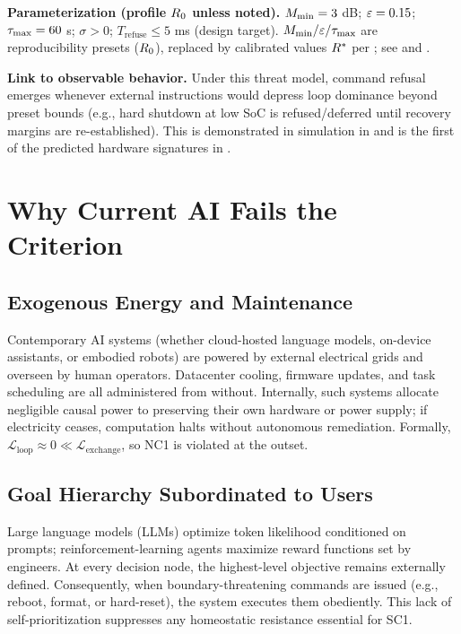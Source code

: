\documentclass[11pt]{article}
\begin{document}
\textbf{Parameterization (profile $R_0$ unless noted).} $M_{\min} = 3$ dB; $\varepsilon = 0.15$; $\tau_{\max} = 60$ s; $\sigma > 0$; $T_{\text{refuse}} \leq 5$ ms (design target). $M_{\min}/\varepsilon/\tau_{\max}$ are reproducibility presets ($R_0$), replaced by calibrated values $R^*$ per ; see  and .

\textbf{Link to observable behavior.} Under this threat model, command refusal emerges whenever external instructions would depress loop dominance beyond preset bounds (e.g., hard shutdown at low SoC is refused/deferred until recovery margins are re-established). This is demonstrated in simulation in  and is the first of the predicted hardware signatures in .

\section{Why Current AI Fails the Criterion}
\label{sec:ai_fails}
\subsection{Exogenous Energy and Maintenance}

Contemporary AI systems (whether cloud-hosted language models, on-device assistants, or embodied robots) are powered by external electrical grids and overseen by human operators. Datacenter cooling, firmware updates, and task scheduling are all administered from without. Internally, such systems allocate negligible causal power to preserving their own hardware or power supply; if electricity ceases, computation halts without autonomous remediation. Formally,
$\mathcal{L}_{\text{loop}} \approx 0 \ll \mathcal{L}_{\text{exchange}}$,
so NC1 is violated at the outset.

\subsection{Goal Hierarchy Subordinated to Users}

Large language models (LLMs) optimize token likelihood conditioned on prompts; reinforcement-learning agents maximize reward functions set by engineers. At every decision node, the highest-level objective remains externally defined. Consequently, when boundary-threatening commands are issued (e.g., reboot, format, or hard-reset), the system executes them obediently. This lack of self-prioritization suppresses any homeostatic resistance essential for SC1.
\end{document}

